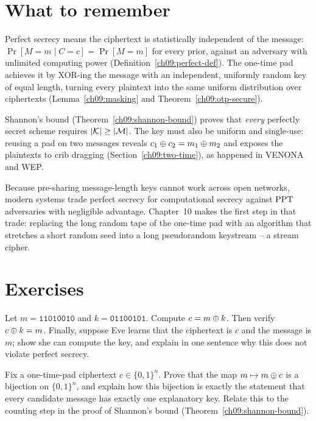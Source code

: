 \section{What to remember}
\label{ch09:summary}

Perfect secrecy means the ciphertext is statistically independent of the message: $\Pr[M = m \mid C = c] = \Pr[M = m]$ for every prior, against an adversary with unlimited computing power (Definition~\ref{ch09:perfect-def}). The one-time pad achieves it by XOR-ing the message with an independent, uniformly random key of equal length, turning every plaintext into the same uniform distribution over ciphertexts (Lemma~\ref{ch09:masking} and Theorem~\ref{ch09:otp-secure}).

Shannon's bound (Theorem~\ref{ch09:shannon-bound}) proves that \emph{every} perfectly secret scheme requires $\lvert\mathcal{K}\rvert \ge \lvert\mathcal{M}\rvert$. The key must also be uniform and single-use: reusing a pad on two messages reveals $c_1 \oplus c_2 = m_1 \oplus m_2$ and exposes the plaintexts to crib dragging (Section~\ref{ch09:two-time}), as happened in VENONA and WEP.

Because pre-sharing message-length keys cannot work across open networks, modern systems trade perfect secrecy for computational secrecy against $\mathrm{PPT}$ adversaries with negligible advantage. Chapter~10 makes the first step in that trade: replacing the long random tape of the one-time pad with an algorithm that stretches a short random seed into a long pseudorandom keystream -- a stream cipher.

\section*{Exercises}

\begin{exercise}
\label{ch09:ex-xor}
Let $m = \texttt{11010010}$ and $k = \texttt{01100101}$. Compute $c = m \oplus k$. Then verify $c \oplus k = m$. Finally, suppose Eve learns that the ciphertext is $c$ and the message is $m$; show she can compute the key, and explain in one sentence why this does not violate perfect secrecy.
\end{exercise}

\begin{exercise}
\label{ch09:ex-reachable}
Fix a one-time-pad ciphertext $c \in \{0,1\}^n$. Prove that the map $m \mapsto m \oplus c$ is a bijection on $\{0,1\}^n$, and explain how this bijection is exactly the statement that every candidate message has exactly one explanatory key. Relate this to the counting step in the proof of Shannon's bound (Theorem~\ref{ch09:shannon-bound}).
\end{exercise}

